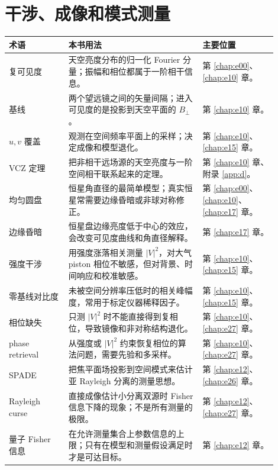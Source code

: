 \section{干涉、成像和模式测量}
\label{appsec:c-interferometry}

\begin{longtable}{p{0.20\linewidth}p{0.45\linewidth}p{0.25\linewidth}}
\toprule
术语 & 本书用法 & 主要位置 \\
\midrule
复可见度 & 天空亮度分布的归一化 Fourier 分量；振幅和相位都属于一阶相干信息。 & 第 \ref{chap:e00}、\ref{chap:e10} 章。 \\
基线 & 两个望远镜之间的矢量间隔；进入可见度的是投影到天空平面的 \(B_\perp\)。 & 第 \ref{chap:e10} 章。 \\
\(u,v\) 覆盖 & 观测在空间频率平面上的采样；决定成像和模型退化。 & 第 \ref{chap:e10}、\ref{chap:e15} 章。 \\
VCZ 定理 & 把非相干远场源的天空亮度与一阶空间相干联系起来的定理。 & 第 \ref{chap:e10} 章、附录 \ref{app:d}。 \\
均匀圆盘 & 恒星角直径的最简单模型；真实恒星常需要边缘昏暗或非球对称修正。 & 第 \ref{chap:e00}、\ref{chap:e10}、\ref{chap:e17} 章。 \\
边缘昏暗 & 恒星盘边缘亮度低于中心的效应，会改变可见度曲线和角直径解释。 & 第 \ref{chap:e17} 章。 \\
强度干涉 & 用强度涨落相关测量 \(|V|^2\)，对大气 piston 相位不敏感，但对背景、时间响应和校准敏感。 & 第 \ref{chap:e10}、\ref{chap:e15} 章。 \\
零基线对比度 & 未被空间分辨率压低时的相关峰幅度，常用于标定仪器稀释因子。 & 第 \ref{chap:e10}、\ref{chap:e15} 章。 \\
相位缺失 & 只测 \(|V|^2\) 时不能直接得到复相位，导致镜像和非对称结构退化。 & 第 \ref{chap:e10}、\ref{chap:e27} 章。 \\
phase retrieval & 从强度或 \(|V|^2\) 约束恢复相位的算法问题，需要先验和多采样。 & 第 \ref{chap:e10}、\ref{chap:e27} 章。 \\
SPADE & 把焦平面场投影到空间模式来估计亚 Rayleigh 分离的测量思想。 & 第 \ref{chap:e12}、\ref{chap:e26} 章。 \\
Rayleigh curse & 直接成像估计小分离双源时 Fisher 信息下降的现象；不是所有测量的极限。 & 第 \ref{chap:e12}、\ref{chap:e27} 章。 \\
量子 Fisher 信息 & 在允许测量集合上参数信息的上限；只有在模型和测量假设满足时才是可达目标。 & 第 \ref{chap:e12} 章。 \\
\bottomrule
\end{longtable}

